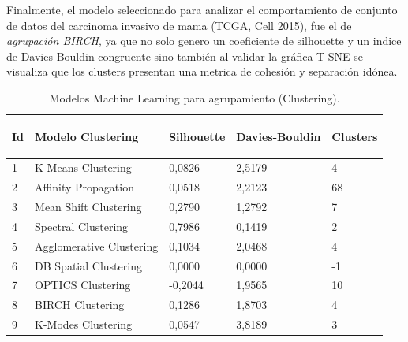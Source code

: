 Finalmente, el modelo seleccionado para analizar el comportamiento de conjunto de datos del carcinoma invasivo de mama (TCGA, Cell 2015), fue el de \textit{agrupación BIRCH}, ya que no solo genero un coeficiente de silhouette  y un indice de Davies-Bouldin congruente sino también al validar la gráfica T-SNE se visualiza que los clusters presentan una metrica de cohesión y separación idónea.

\begin{table} [!htb]
	\footnotesize
	\begin{threeparttable}
		\caption{Modelos Machine Learning para agrupamiento (Clustering).}
		\label{Clustering_Models}
		\begin{tabular}{p{1cm} p{6cm} p{2.5cm} p{2.5cm} p{1.5cm}} \toprule	
		\begin{center}Id\end{center}
		&\begin{center}Modelo Clustering\end{center}
		&\begin{center}Silhouette\end{center}
		&\begin{center}Davies-Bouldin\end{center}
		&\begin{center}Clusters\end{center}
		\\ \hline 1 & K-Means Clustering 	&	0,0826	&	2,5179	&	4
		\\ \hline 2 & Affinity Propagation	&	0,0518	&	2,2123	&	68
		\\ \hline 3 & Mean Shift Clustering 	&	0,2790	&	1,2792	&	7
		\\ \hline 4 & Spectral Clustering	&	0,7986	&	0,1419	&	2
		\\ \hline 5 & Agglomerative Clustering	&	0,1034	&	2,0468	&	4
		\\ \hline 6 & DB Spatial Clustering 	&	0,0000	&	0,0000	&	-1
		\\ \hline 7 & OPTICS Clustering	&	-0,2044	&	1,9565	&	10
		\\ \hline 8 & BIRCH Clustering	&	0,1286	&	1,8703	&	4
		\\ \hline 9 & K-Modes Clustering	&	0,0547	&	3,8189	&	3
		\\ \hline
		\end{tabular}
	\end{threeparttable}
\end{table}

